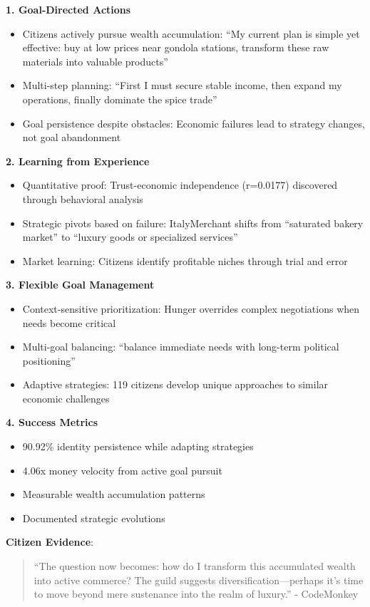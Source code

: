 \documentclass[12pt,a4paper]{article}
\begin{document}
\textbf{1. Goal-Directed Actions}
\begin{itemize}
    \item Citizens actively pursue wealth accumulation: ``My current plan is simple yet effective: buy at low prices near gondola stations, transform these raw materials into valuable products''
    \item Multi-step planning: ``First I must secure stable income, then expand my operations, finally dominate the spice trade''
    \item Goal persistence despite obstacles: Economic failures lead to strategy changes, not goal abandonment
\end{itemize}

\textbf{2. Learning from Experience}
\begin{itemize}
    \item Quantitative proof: Trust-economic independence (r=0.0177) discovered through behavioral analysis
    \item Strategic pivots based on failure: ItalyMerchant shifts from ``saturated bakery market'' to ``luxury goods or specialized services''
    \item Market learning: Citizens identify profitable niches through trial and error
\end{itemize}

\textbf{3. Flexible Goal Management}
\begin{itemize}
    \item Context-sensitive prioritization: Hunger overrides complex negotiations when needs become critical
    \item Multi-goal balancing: ``balance immediate needs with long-term political positioning''
    \item Adaptive strategies: 119 citizens develop unique approaches to similar economic challenges
\end{itemize}

\textbf{4. Success Metrics}
\begin{itemize}
    \item 90.92\% identity persistence while adapting strategies
    \item 4.06x money velocity from active goal pursuit
    \item Measurable wealth accumulation patterns
    \item Documented strategic evolutions
\end{itemize}

\textbf{Citizen Evidence}:
\begin{quote}
``The question now becomes: how do I transform this accumulated wealth into active commerce? The guild suggests diversification—perhaps it's time to move beyond mere sustenance into the realm of luxury.'' - CodeMonkey
\end{quote}
\end{document}
